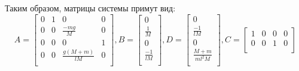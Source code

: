 Таким образом, матрицы системы примут вид: 
\begin{equation}
    A = \begin{bmatrix}
        0 & 1 & 0 & 0 \\
        0 & 0 & \frac{-mg}{M} & 0 \\
        0 & 0 & 0 & 1 \\
        0 & 0 & \frac{g(M + m)}{lM} & 0 \\
    \end{bmatrix}, B = \begin{bmatrix}
        0 \\
        \frac{1}{M} \\
        0 \\
        \frac{-1}{lM} \\
    \end{bmatrix}, D = \begin{bmatrix}
        0 \\
        \frac{-1}{lM} \\
        0 \\
        \frac{M + m}{ml^2M} \\ 
    \end{bmatrix}, C = \begin{bmatrix}
        1 & 0 & 0 & 0 \\
        0 & 0 & 1 & 0 \\ 
    \end{bmatrix}
\end{equation}
